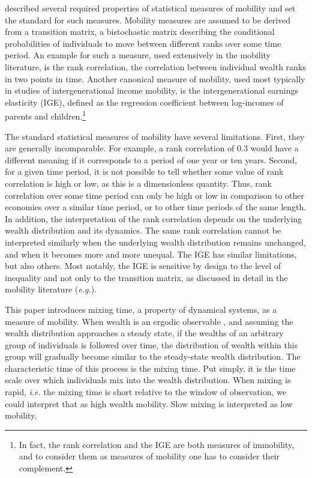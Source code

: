 \documentclass[11pt]{article}
\newcommand{\ie}{{\it i.e.}\xspace}
\newcommand{\eg}{{\it e.g.}\xspace}
\numberwithin{equation}{section}
\begin{document}
\citet{Shorrocks1978} described several required properties of statistical measures of mobility and set the standard for such measures. Mobility measures are assumed to be derived from a transition matrix, a bistochastic matrix describing the conditional probabilities of individuals to move between different ranks over some time period. An example for such a measure, used extensively in the mobility literature, is the rank correlation, the correlation between individual wealth ranks in two points in time. Another canonical measure of mobility, used most typically in studies of intergenerational income mobility, is the intergenerational earnings elasticity (IGE), defined as the regression coefficient between log-incomes of parents and children.\footnote{In fact, the rank correlation and the IGE are both measures of immobility, and to consider them as measures of mobility one has to consider their complement.}

The standard statistical measures of mobility have several limitations. First, they are generally incomparable. For example, a rank correlation of 0.3 would have a different meaning if it corresponds to a period of one year or ten years. Second, for a given time period, it is not possible to tell whether some value of rank correlation is high or low, as this is a dimensionless quantity. Thus, rank correlation over some time period can only be high or low in comparison to other economies over a similar time period, or to other time periods of the same length.
In addition, the interpretation of the rank correlation depends on the underlying wealth distribution and its dynamics. The same rank correlation cannot be interpreted similarly when the underlying wealth distribution remains unchanged, and when it becomes more and more unequal.
The IGE has similar limitations, but also others. Most notably, the IGE is sensitive by design to the level of inequality and not only to the transition matrix, as discussed in detail in the mobility literature (\eg \citet{chettyETAL2014}).

This paper introduces mixing time, a property of dynamical systems, as a measure of mobility. When wealth is an ergodic observable \citep{PetersAdamou2018c}, and assuming the wealth distribution approaches a steady state, if the wealths of an arbitrary group of individuals is followed over time, the distribution of wealth within this group will gradually become similar to the steady-state wealth distribution. The characteristic time of this process is the mixing time. Put simply, it is the time scale over which individuals mix into the wealth distribution. When mixing is rapid, \ie the mixing time is short relative to the window of observation, we could interpret that as high wealth mobility. Slow mixing is interpreted as low mobility.
\end{document}
